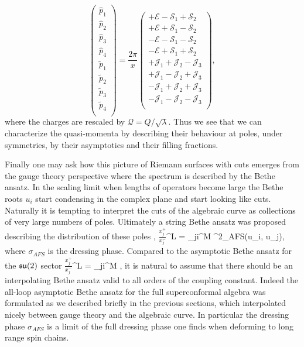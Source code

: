 \begin{equation}
\left(
\begin{array}{c}
  \hat{p}_1 \\
  \hat{p}_2 \\
  \hat{p}_3 \\
  \hat{p}_4 \\
  \hline
  \tilde{p}_1 \\
  \tilde{p}_2 \\
  \tilde{p}_3 \\
  \tilde{p}_4 \\
\end{array}
\right) = \frac{2 \pi}{x}
\left(
\begin{array}{c}
  + \mathcal{E} - \mathcal{S}_1 + \mathcal{S}_2 \\
  + \mathcal{E} + \mathcal{S}_1 - \mathcal{S}_2 \\
  - \mathcal{E} - \mathcal{S}_1 - \mathcal{S}_2 \\
  - \mathcal{E} + \mathcal{S}_1 + \mathcal{S}_2 \\
  \hline
  + \mathcal{J}_1 + \mathcal{J}_2 - \mathcal{J}_3 \\
  + \mathcal{J}_1 - \mathcal{J}_2 + \mathcal{J}_3 \\
  - \mathcal{J}_1 + \mathcal{J}_2 + \mathcal{J}_3 \\
  - \mathcal{J}_1 - \mathcal{J}_2 - \mathcal{J}_3 \\
\end{array}
\right),
\label{eq:quasi_asymptotics}
\end{equation}
where the charges are rescaled by $\mathcal{Q} = Q / \sqrt{\lambda}$. 
Thus we see that we can characterize the quasi-momenta by describing their behaviour at poles, under symmetries, by their asymptotics and their filling fractions. 

Finally one may ask how this picture of Riemann surfaces with cuts emerges from the gauge theory perspective where the spectrum is described by the Bethe ansatz. 
In the scaling limit when lengths of operators become large the Bethe roots $u_i$ start condensing in the complex plane and start looking like cuts. 
Naturally it is tempting to interpret the cuts of the algebraic curve as collections of very large numbers of poles.
Ultimately a string Bethe ansatz was proposed describing the distribution of these poles \cite{Arutyunov:2004vx},
\beq
	\(\frac{x_j^+}{x_j^-}\)^L = \prod_{j\neq i}^M  \sigma^2_{AFS}(u_i, u_j),
\eeq
where $\sigma_{AFS}$ is the dressing phase.
Compared to the asymptotic Bethe ansatz for the $\mathfrak{su}(2)$ sector
\beq
	\(\frac{x_j^+}{x_j^-}\)^L = \prod_{j\neq i}^M ,
\eeq
it is natural to assume that there should be an interpolating Bethe ansatz valid to all orders of the coupling constant.
Indeed the all-loop asymptotic Bethe ansatz for the full superconformal algebra was formulated \cite{Beisert:2005fw} as we described briefly in the previous sections, which interpolated nicely between gauge theory and the algebraic curve. 
In particular the dressing phase $\sigma_{AFS}$ is a limit of the full dressing phase  one finds when deforming to long range spin chains.


